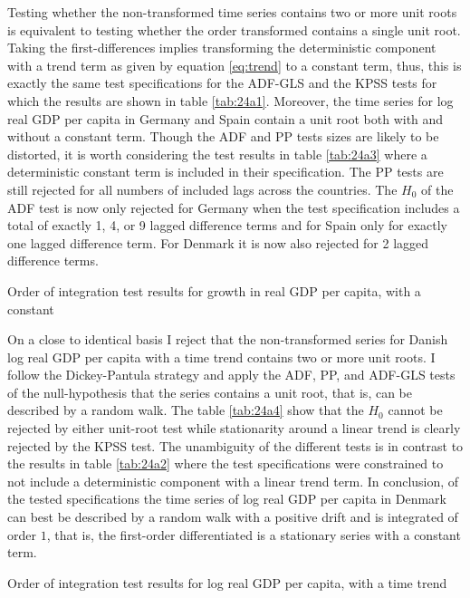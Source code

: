 Testing whether the non-transformed time series contains two or more unit roots is equivalent to testing whether the  order transformed contains a single unit root. Taking the first-differences implies transforming the deterministic component with a trend term as given by equation \ref{eq:trend} to a constant term, thus, this is exactly the same test specifications for the ADF-GLS and the KPSS tests for which the results are shown in table \ref{tab:24a1}. Moreover, the time series for log real GDP per capita in Germany and Spain contain a unit root both with and without a constant term. Though the ADF and PP tests sizes are likely to be distorted, it is worth considering the test results in table \ref{tab:24a3} where a deterministic constant term is included in their specification. The PP tests are still rejected for all numbers of included lags across the countries. The $H_0$ of the ADF test is now only rejected for Germany when the test specification includes a total of exactly 1, 4, or 9 lagged difference terms and for Spain only for exactly one lagged difference term. For Denmark it is now also rejected for 2 lagged difference terms.
\begin{table}[H]
  \centering
  \caption{Order of integration test results for growth in real GDP per capita, with a constant}
    \footnotesize
    
    \label{tab:24a3}
\end{table}\noindent
On a close to identical basis I reject that the non-transformed series for Danish log real GDP per capita with a time trend contains two or more unit roots. I follow the Dickey-Pantula strategy and apply the ADF, PP, and ADF-GLS tests of the null-hypothesis that the series contains a unit root, that is, can be described by a random walk. The table \ref{tab:24a4} show that the $H_0$ cannot be rejected by either unit-root test while stationarity around a linear trend is clearly rejected by the KPSS test. The unambiguity of the different tests is in contrast to the results in table \ref{tab:24a2} where the test specifications were constrained to not include a deterministic component with a linear trend term. In conclusion, of the tested specifications the time series of log real GDP per capita in Denmark can best be described by a random walk with a positive drift and is integrated of order $1$, that is, the first-order differentiated is a stationary series with a constant term.
\begin{table}[H]
  \centering
  \caption{Order of integration test results for log real GDP per capita, with a time trend}
    \footnotesize
    
    \label{tab:24a4}
\end{table}\noindent

